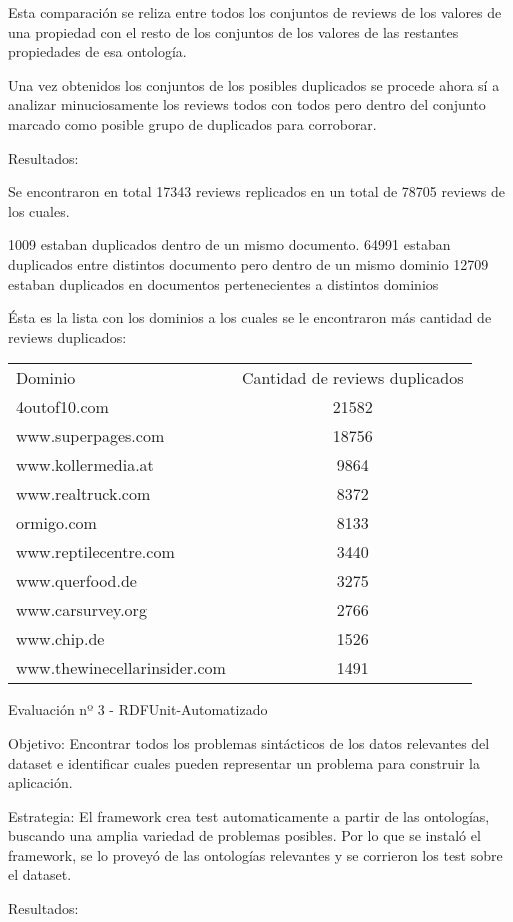 Esta comparación se reliza entre todos los conjuntos de reviews de los valores de una propiedad con el resto de los conjuntos de los valores de las restantes propiedades de esa ontología.

Una vez obtenidos los conjuntos de los posibles duplicados se procede ahora sí a analizar minuciosamente los reviews todos con todos pero dentro del conjunto marcado como posible grupo de duplicados
para corroborar.

Resultados:

Se encontraron en total 17343 reviews replicados en un total de 78705 reviews de los cuales.

1009 estaban duplicados dentro de un mismo documento.
64991 estaban duplicados entre distintos documento pero dentro de un mismo dominio
12709 estaban duplicados en documentos pertenecientes a distintos dominios

Ésta es la lista con los dominios a los cuales se le encontraron más cantidad de reviews duplicados:


\begin{tabular}{| l | c | }
Dominio & Cantidad de reviews duplicados \\
4outof10.com &	21582\\
www.superpages.com &	18756\\
www.kollermedia.at &	9864\\
www.realtruck.com &	8372\\
ormigo.com &	8133\\
www.reptilecentre.com &	3440\\
www.querfood.de &	3275\\
www.carsurvey.org &	2766\\
www.chip.de &	1526\\
www.thewinecellarinsider.com &	1491\\
\end{tabular}

Evaluación nº 3 - RDFUnit-Automatizado

Objetivo:
Encontrar todos los problemas sintácticos de los datos relevantes del dataset e identificar cuales pueden representar un problema 
para construir la aplicación.

Estrategia:
El framework crea test automaticamente a partir de las ontologías, buscando una amplia variedad de problemas posibles. Por lo que se 
instaló el framework, se lo proveyó de las ontologías relevantes y se corrieron los test sobre el dataset.

Resultados:

